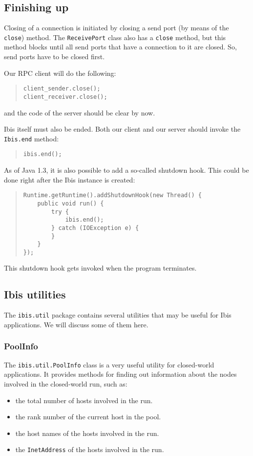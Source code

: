\documentclass[10pt]{article}
\newcommand{\mysubsection}[1]{\subsection{#1}\label{#1}}
\newcommand{\mysubsubsection}[1]{\subsubsection{#1}\label{#1}}
\begin{document}
\subsection{Finishing up}

Closing of a connection is initiated by closing a send port
(by means of the \verb+close+) method. The \verb+ReceivePort+
class also has a \verb+close+ method, but this method blocks
until all send ports that have a connection to it are closed.
So, send ports have to be closed first.

Our RPC client will do the following:

\begin{quote}
\begin{verbatim}
client_sender.close();
client_receiver.close();
\end{verbatim}
\end{quote}
and the code of the server should be clear by now.

Ibis itself must also be ended. Both our client and our server
should invoke the \verb+Ibis.end+ method:
\begin{quote}
\begin{verbatim}
ibis.end();
\end{verbatim}
\end{quote}

As of Java 1.3, it is also possible to add a so-called shutdown hook.
This could be done right after the Ibis instance is created:
\begin{quote}
\begin{verbatim}
Runtime.getRuntime().addShutdownHook(new Thread() {
    public void run() {
        try {
            ibis.end();
        } catch (IOException e) {
        }
    }
});
\end{verbatim}
\end{quote}

This shutdown hook gets invoked when the program terminates.

\mysubsection{Ibis utilities}

The \verb+ibis.util+ package contains several utilities that may be
useful for Ibis applications. We will discuss some of them here.

\mysubsubsection{PoolInfo}

The \verb+ibis.util.PoolInfo+ class is a very useful utility for
closed-world applications.
It provides methods for finding out information about the nodes
involved in the closed-world run, such as:
\begin{itemize}
\item
the total number of hosts involved in the run.
\item
the rank number of the current host in the pool.
\item
the host names of the hosts involved in the run.
\item
the \verb+InetAddress+ of the hosts involved in the run.
\end{itemize}
\end{document}
